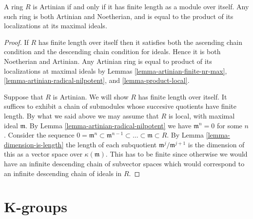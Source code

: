\begin{lemma}
\label{lemma-artinian-finite-length}
A ring $R$ is Artinian if and only if it has finite length
as a module over itself. Any such ring is both Artinian and
Noetherian, and is equal to the product of its localizations
at its maximal ideals.
\end{lemma}

\begin{proof}
If $R$ has finite length over itself then it satisfies both 
the ascending chain condition and the descending chain
condition for ideals. Hence it is both Noetherian and Artinian.
Any Artinian ring is equal to product of its localizations
at maximal ideals by Lemmas \ref{lemma-artinian-finite-nr-max},
\ref{lemma-artinian-radical-nilpotent}, and \ref{lemma-product-local}.

\medskip\noindent
Suppose that $R$ is Artinian. We will show $R$ has finite
length over itself. It suffices to exhibit a chain of
submodules whose succesive quotients have finite length.
By what we said above
we may assume that $R$ is local, with maximal ideal $\mathfrak m$.
By Lemma \ref{lemma-artinian-radical-nilpotent} we have
$\mathfrak m^n =0$ for some $n$. 
Consider the sequence
$0 = \mathfrak m^n \subset \mathfrak m^{n-1} \subset
\ldots \subset \mathfrak m \subset R$. By Lemma
\ref{lemma-dimension-is-length} the length of each subquotient
$\mathfrak m^j/\mathfrak m^{j+1}$ is the dimension of this
as a vector space over $\kappa(\mathfrak m)$. This has to be
finite since otherwise we would have an infinite descending
chain of subvector spaces which would correspond to an
infinite descending chain of ideals in $R$.
\end{proof}






































\section{K-groups}
\label{section-K-groups}

